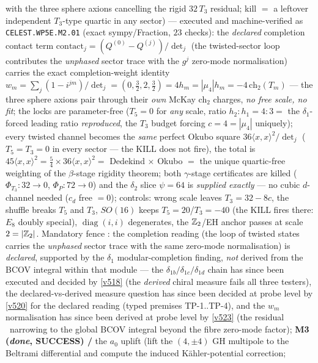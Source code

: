 with the three sphere axions cancelling the rigid $32\,T_3$ residual; kill $=$ a leftover
independent $T_3$-type quartic in any sector) --- executed and machine-verified as
\texttt{CELEST.WP5E.M2.01}  (exact
sympy/Fraction, $23$ checks): the \emph{declared} completion contact term
$\mathrm{contact}_j=(Q^{(0)}-Q^{(j)})/\det_j$ (the twisted-sector loop contributes the
\emph{unphased} sector trace with the $g^j$ zero-mode normalisation) carries the exact
completion-weight identity $w_m=\sum_j(1-i^{jm})/\det_j=(0,\tfrac32,2,\tfrac32)=4h_m=
|\mu_4|h_m=-4\,\mathrm{ch}_2(T_m)$ --- the three sphere axions pair through their \emph{own}
McKay ch$_2$ charges, \emph{no free scale, no fit}; the locks are parameter-free ($T_5=0$ for
\emph{any} scale, ratio $h_2{:}h_1=4{:}3=$ the $\delta_1$-forced leading ratio \emph{reproduced},
the $T_3$ budget forcing $c=4=|\mu_4|$ uniquely); every twisted channel becomes the \emph{same}
perfect Okubo square $36\langle x,x\rangle^2/\det_j$ ($T_5=T_3=0$ in every sector --- the KILL
does not fire), the total is $45\langle x,x\rangle^2=\tfrac54\times36\langle x,x\rangle^2=$
Dedekind $\times$ Okubo $=$ the unique quartic-free weighting of the $\beta$-stage rigidity
theorem; both $\gamma$-stage certificates are killed ($\Phi_{T_3}\!:32\to0$, $\Phi_P\!:72\to0$)
and the $\delta_2$ slice $\psi=64$ is \emph{supplied exactly} --- no cubic $d$-channel needed
($c_d$ free $=0$); controls: wrong scale leaves $T_3=32-8c$, the shuffle breaks $T_5$ and $T_3$,
$SO(16)$ keeps $T_5=20$/$T_3=-40$ (the KILL fires there: $E_8$ doubly special),
$\operatorname{diag}(i,i)$ degenerates, the $\mathbb Z_2$/EH anchor passes at scale $2=|\mathbb Z_2|$.
Mandatory fence \mC: the completion reading (the loop of twisted states carries the
\emph{unphased} sector trace with the same zero-mode normalisation) is \emph{declared},
supported by the $\delta_1$ modular-completion finding, \emph{not} derived from the BCOV
integral within that module --- the $\delta_{1b}/\delta_{1c}/\delta_{1d}$ chain has since been
executed and decided by \vref{v518} (the \emph{derived} chiral measure fails all three testers),
the declared-vs-derived measure question has since been decided at probe level by
\vref{v520} for the declared reading (typed premises TP-1..TP-4), and the $w_m$ normalisation
has since been derived at probe level by \vref{v523} (the residual \mO\ narrowing to the
global BCOV integral beyond the fibre zero-mode factor);
\textbf{M3 (\emph{done}, SUCCESS) \mE/\mC} the $a_0$ uplift (lift the $(4,\pm4)$ GH
multipole to the Beltrami differential and compute the induced K\"ahler-potential correction;
